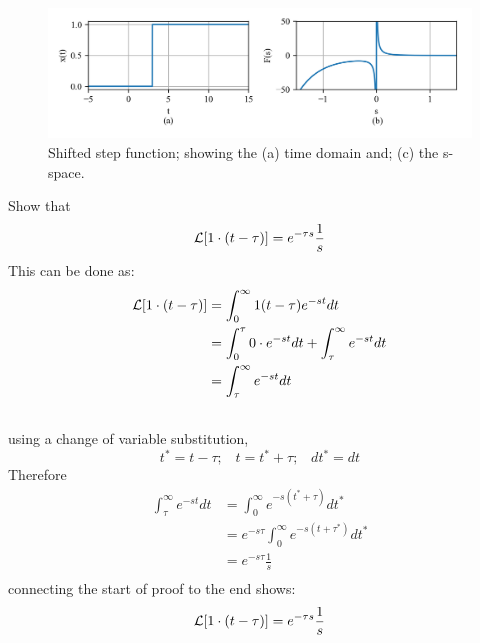\documentclass[12pt,letter]{article}
\begin{document}
		\begin{figure}[H]
			\centering
			\includegraphics[width=6.5in]{../figures/T_and_S_shifted_space_step_function}
			\caption{Shifted step function; showing the (a) time domain and; (c) the s-space. }
			\label{fig:Laplace_shifted_step_transform}
		\end{figure}

\begin{mdframed}[middlelinewidth=0.5mm]
\begin{center}
\end{center}
Show that
\begin{equation}
\mathcal{L}{\left[1\cdot(t-\tau)\right]} =e^{-\tau s} \frac{1}{s}
\end{equation}
This can be done as:
\begin{equation}
\end{equation}
\begin{align}
	 \mathcal{L}{\left[1\cdot(t-\tau)\right]}  &=  \int_{0}^{\infty} 1 (t-\tau) e^{-st} dt \\ \nonumber
	&=  \int_{0}^{\tau} 0 \cdot  e^{-st} dt + \int_{\tau}^{\infty} e^{-st} dt  \\ \nonumber
	&=  \int_{\tau}^{\infty} e^{-st} dt  \\ \nonumber
\end{align}
using a change of variable substitution, 
\begin{equation}
t^* = t-\tau; \; \; \; t = t^* + \tau; \; \; \; dt^* = dt
\end{equation}
Therefore
\begin{align}
	 \int_{\tau}^{\infty} e^{-st} dt  &=  \int_{0}^{\infty}e ^ {-s (t^* + \tau)} dt^* \\ \nonumber
	&=  e^{-s \tau}  \int_{0}^{\infty}e ^ {-s (t + \tau^*)} dt^*   \\ \nonumber
	&=  e^{-s \tau} \frac{1}{s}  \\ \nonumber
\end{align}
connecting the start of proof to the end shows:
\begin{equation}
\mathcal{L}{\left[1\cdot(t-\tau)\right]} =e^{-\tau s} \frac{1}{s}
\end{equation}
\end{mdframed}
\end{document}
